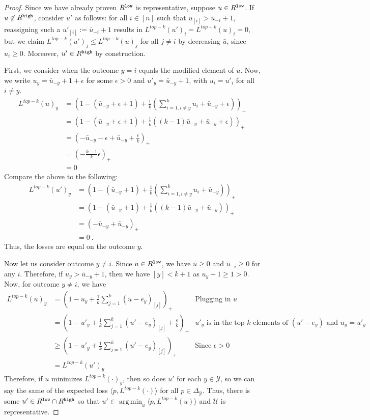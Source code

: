 \documentclass[12pt]{article}
\newcommand{\ubar}{\bar{u}}
\newcommand{\simplex}{\Delta_\Y}
\newcommand{\U}{\mathcal{U}}
\newcommand{\Y}{\mathcal{Y}}
\newcommand{\inprod}[2]{\langle #1, #2 \rangle}%
\DeclareMathOperator*{\argmin}{arg\,min}
\begin{document}
\begin{proof}
  Since we have already proven $R^{\tt low}$ is representative, suppose $u \in R^{\tt low}$.
  If $u \not \in R^{\tt high}$, consider $u'$ as follows: for all $i \in [n]$ such that $u_{[i]} > \bar u_{-i} + 1$, reassigning such a $u'_{[i]} := \bar u_{-i} +1$ results in $L^{top-k}(u')_i = L^{top-k}(u)_i = 0$, but we claim $L^{top-k}(u')_j \leq L^{top-k}(u)_j$ for all $j \neq i$ by decreasing $\ubar$, since $u_i \geq 0$.
  Moreover, $u' \in R^{\tt high}$ by construction.

First, we consider when the outcome $y = i$ equals the modified element of $u$.
Now, we write $u_y = \bar u_{-y} + 1 + \epsilon$ for some $\epsilon > 0$ and $u'_y = \bar u_{-y} + 1$, with $u_i = u'_i$ for all $i \neq y$. 
\begin{align*}
L^{top-k}(u)_y &= \left(1 - (\bar u_{-y} + \epsilon + 1) + \frac 1 k \left(\sum_{i=1, i \neq y}^k u_i + \bar u_{-y} + \epsilon\right) \right)_+\\ 
&= \left(1 - (\bar u_{-y} + \epsilon + 1) + \frac 1 k \left((k-1) \bar u_{-y} + \bar u_{-y} + \epsilon\right) \right)_+\\
&= \left(-\bar u_{-y} - \epsilon + \bar u_{-y} + \frac \epsilon k \right)_+ \\
&= (-\frac{k-1}{k}\epsilon)_+\\
&= 0
\end{align*}
Compare the above to the following:
\begin{align*}
L^{top-k}(u')_y &= \left(1 - (\bar u_{-y} + 1) + \frac 1 k \left(\sum_{i=1, i \neq y}^k u_i + \bar u_{-y} \right) \right)_+\\ 
&= \left(1 - (\bar u_{-y} + 1) + \frac 1 k \left((k-1) \bar u_{-y} + \bar u_{-y} \right) \right)_+\\
&= \left(-\bar u_{-y} + \bar u_{-y}\right)_+ \\
&= 0~.~
\end{align*}
Thus, the losses are equal on the outcome $y$.

Now let us consider outcome $y\neq i$.
Since $u \in R^{\tt low}$, we have $\bar u \geq 0$ and $\bar u_{-i} \geq 0$ for any $i$.
Therefore, if $u_y > \bar u_{-y} + 1$, then we have $[y] < k+1$ as $u_y + 1 \geq 1 > 0$.
Now, for outcome $y \neq i$, we have 
\begin{align*}
L^{top-k}(u)_y &= \left( 1 - u_y + \frac 1 k \sum_{j=1}^k (u-e_y)_{[j]} \right)_+ &\text{Plugging in $u$}\\
	&= \left( 1 - u'_y + \frac 1 k \sum_{j=1}^k (u'-e_y)_{[j]} + \frac {\epsilon}{k}\right)_+ & \text{$u'_y$ is in the top $k$ elements of $(u' - e_y)$ and $u_y = u'_y$}\\
	&\geq \left( 1 - u'_y + \frac 1 k \sum_{j=1}^k (u'-e_y)_{[j]}\right)_+ & \text{Since $\epsilon > 0$}\\
	&= L^{top-k}(u')_y
\end{align*}
Therefore, if $u$ minimizes $L^{top-k}(\cdot)_y$, then so does $u'$ for each $y \in \Y$, so we can say the same of the expected loss $\inprod{p}{L^{top-k}(\cdot)}$ for all $p \in \simplex$.
Thus, there is some $u' \in R^{\tt low} \cap R^{\tt high}$ so that $u' \in \argmin_u \inprod{p}{L^{top-k}(u)}$ and $\U$ is representative.
\end{proof}
\end{document}
